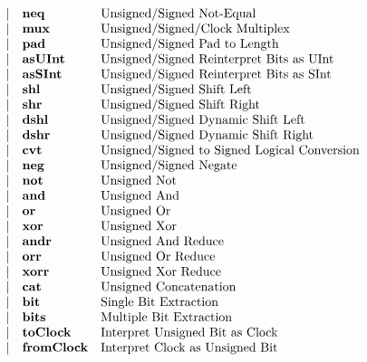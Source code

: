 \documentclass[12pt]{article}
\begin{document}
\[{\begin{array}{rrll}
              &\vert           &\text{\bf neq}            &\text{Unsigned/Signed Not-Equal}\\
              &\vert           &\text{\bf mux}            &\text{Unsigned/Signed/Clock Multiplex}\\
              &\vert           &\text{\bf pad}            &\text{Unsigned/Signed Pad to Length}\\
              &\vert           &\text{\bf asUInt}         &\text{Unsigned/Signed Reinterpret Bits as UInt}\\
              &\vert           &\text{\bf asSInt}         &\text{Unsigned/Signed Reinterpret Bits as SInt}\\
              &\vert           &\text{\bf shl}            &\text{Unsigned/Signed Shift Left}\\
              &\vert           &\text{\bf shr}            &\text{Unsigned/Signed Shift Right}\\
              &\vert           &\text{\bf dshl}           &\text{Unsigned/Signed Dynamic Shift Left}\\
              &\vert           &\text{\bf dshr}           &\text{Unsigned/Signed Dynamic Shift Right}\\
              &\vert           &\text{\bf cvt}            &\text{Unsigned/Signed to Signed Logical Conversion}\\
              &\vert           &\text{\bf neg}            &\text{Unsigned/Signed Negate}\\
              &\vert           &\text{\bf not}            &\text{Unsigned Not}\\
              &\vert           &\text{\bf and}            &\text{Unsigned And}\\
              &\vert           &\text{\bf or}             &\text{Unsigned Or}\\
              &\vert           &\text{\bf xor}            &\text{Unsigned Xor}\\
              &\vert           &\text{\bf andr}           &\text{Unsigned And Reduce}\\
              &\vert           &\text{\bf orr}            &\text{Unsigned Or Reduce}\\
              &\vert           &\text{\bf xorr}           &\text{Unsigned Xor Reduce}\\
              &\vert           &\text{\bf cat}            &\text{Unsigned Concatenation}\\
              &\vert           &\text{\bf bit}            &\text{Single Bit Extraction}\\
              &\vert           &\text{\bf bits}           &\text{Multiple Bit Extraction}\\
              &\vert           &\text{\bf toClock}        &\text{Interpret Unsigned Bit as Clock}\\
              &\vert           &\text{\bf fromClock}      &\text{Interpret Clock as Unsigned Bit}
\end{array}
}
\]
\end{document}
